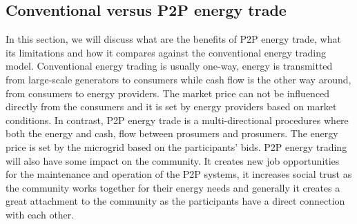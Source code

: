 \subsection{Conventional versus P2P energy trade}
In this section, we will discuss what are the benefits of P2P energy trade, what its limitations
and how it compares against the conventional energy trading model. Conventional energy trading is usually one-way,
energy is transmitted from large-scale generators to consumers while cash flow is the other way around, from consumers to
energy providers. The market price can not be influenced directly from the consumers and it is set by energy providers based on market
conditions. In contrast, P2P energy trade is a multi-directional procedures where both the energy and cash, flow between prosumers
and prosumers. The energy price is set by the microgrid based on the participants' bids.
P2P energy trading will also have some impact on the community. It creates new job opportunities for the maintenance and operation
of the P2P systems, it increases social trust as the community works together for their energy needs and generally it creates a great
attachment to the community as the participants have a direct connection with each other. \cite{Soto2021}
